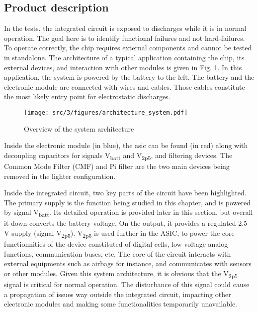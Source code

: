 \subsection{Product description}
\label{sec:product-desc}

In the tests, the integrated circuit is exposed to discharges while it is in normal operation.
The goal here is to identify functional failures and not hard-failures.
To operate correctly, the chip requires external components and cannot be tested in standalone.
The architecture of a typical application containing the chip, its external devices, and interaction with other modules is given in Fig. \ref{fig:system_architecture}.
In this application, the system is powered by the battery to the left.
The battery and the electronic module are connected with wires and cables.
Those cables constitute the most likely entry point for electrostatic discharges.

\begin{figure}[!h]
  \centering
  \texttt{[image: src/3/figures/architecture\_system.pdf]}
  \caption{Overview of the system architecture}
  \label{fig:system_architecture}
\end{figure}

Inside the electronic module (in blue), the \gls{asic} can be found (in red) along with decoupling capacitors for signals V\textsubscript{batt} and V\textsubscript{2p5}, and filtering devices.
The Common Mode Filter (CMF) and Pi filter are the two main devices being removed in the lighter configuration.

Inside the integrated circuit, two key parts of the circuit have been highlighted.
The primary supply is the function being studied in this chapter, and is powered by signal V\textsubscript{batt}.
Its detailed operation is provided later in this section, but overall it down converts the battery voltage.
On the output, it provides a regulated 2.5 V supply (signal V\textsubscript{2p5}).
V\textsubscript{2p5} is used further in the ASIC, to power the core functionnities of the device constituted of digital cells, low voltage analog functions, communication buses, etc.
The core of the circuit interacts with external equipments such as airbags for instance, and communicates with sensors or other modules.
Given this system architecture, it is obvious that the V\textsubscript{2p5} signal is critical for normal operation.
The disturbance of this signal could cause a propagation of issues way outside the integrated circuit, impacting other electronic modules and making some functionalities temporarily unavailable.

